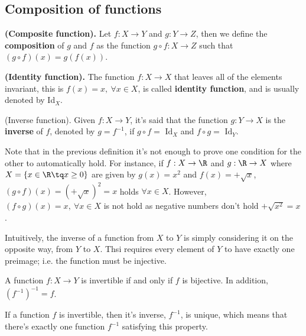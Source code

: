 \subsection{Composition of functions}
\begin{definition}
    \textbf{(Composite function).} Let $f:X\to Y$ and $g:Y\to Z$, then we define the \textbf{composition} of $g$ and $f$ as the function $g\circ f:X\to Z$ such that $\left( g\circ f \right) \left( x \right) = g\left( f\left( x \right)  \right) $.
\end{definition}
\begin{definition}
    \textbf{(Identity function).} The function $f:X\to X$ that leaves all of the elements invariant, this is $f\left( x \right) = x,\ \forall x\in X$, is called \textbf{identity function}, and is usually denoted by Id$_X$.
\end{definition}
\begin{definition}
    \textrm{(Inverse function).} Given $f:X\to Y$, it's said that the function $g:Y\to X$ is the \textbf{inverse} of $f$, denoted by $g = f^{-1}$, if $g\circ f = \textrm{ Id}_X$ and $f\circ g = \textrm{ Id}_Y$.
\end{definition}

Note that in the previous definition it's not enough to prove one condition for the other to automatically hold. For instance, if $f:X\to\R$ and $g:\R\to X$ where $X = \{x\in\R\tq x \geq 0\} $ are given by $g\left( x \right) = x^2$ and $f\left( x \right) = +\sqrt{x}$, $\left( g\circ f \right) \left( x \right) = \left( +\sqrt{x}  \right)^2 = x$ holds $\forall x\in X$. However, $\left( f\circ g \right)\left( x \right) = x,\ \forall x\in X$ is not hold as negative numbers don't hold $+\sqrt{x^2} = x $.

Intuitively, the inverse of a function from $X$ to $Y$ is simply considering it on the opposite way, from $Y$ to $X$. Thsi requires every element of $Y$ to have exactly one preimage; i.e. the function must be injective.

\begin{proposition}
    A function $f:X\to Y$ is invertible if and only if $f$ is bijective. In addition, $\left( f^{-1} \right)^{-1} = f $.
\end{proposition}
\begin{proposition}
    If a function $f$ is invertible, then it's inverse, $f^{-1}$, is unique, which means that there's exactly one function $f^{-1}$ satisfying this property.
\end{proposition}


